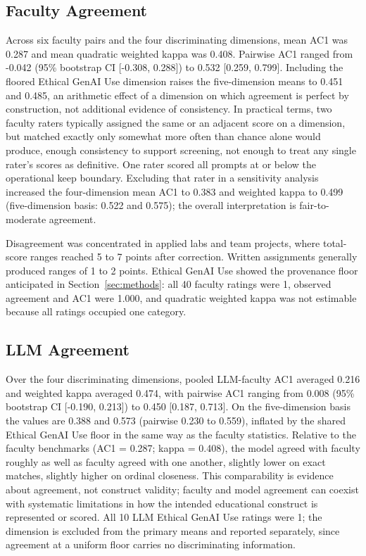 \documentclass[sigconf]{acmart}
\begin{document}
\subsection{Faculty Agreement}
Across six faculty pairs and the four discriminating dimensions, mean AC1 was 0.287 and mean quadratic weighted kappa was 0.408. Pairwise AC1 ranged from -0.042 (95\% bootstrap CI [-0.308, 0.288]) to 0.532 [0.259, 0.799]. Including the floored Ethical GenAI Use dimension raises the five-dimension means to 0.451 and 0.485, an arithmetic effect of a dimension on which agreement is perfect by construction, not additional evidence of consistency. In practical terms, two faculty raters typically assigned the same or an adjacent score on a dimension, but matched exactly only somewhat more often than chance alone would produce, enough consistency to support screening, not enough to treat any single rater's scores as definitive. One rater scored all prompts at or below the operational keep boundary. Excluding that rater in a sensitivity analysis increased the four-dimension mean AC1 to 0.383 and weighted kappa to 0.499 (five-dimension basis: 0.522 and 0.575); the overall interpretation is fair-to-moderate agreement.

Disagreement was concentrated in applied labs and team projects, where total-score ranges reached 5 to 7 points after correction. Written assignments generally produced ranges of 1 to 2 points. Ethical GenAI Use showed the provenance floor anticipated in Section~\ref{sec:methods}: all 40 faculty ratings were 1, observed agreement and AC1 were 1.000, and quadratic weighted kappa was not estimable because all ratings occupied one category.

\subsection{LLM Agreement}
Over the four discriminating dimensions, pooled LLM-faculty AC1 averaged 0.216 and weighted kappa averaged 0.474, with pairwise AC1 ranging from 0.008 (95\% bootstrap CI [-0.190, 0.213]) to 0.450 [0.187, 0.713]. On the five-dimension basis the values are 0.388 and 0.573 (pairwise 0.230 to 0.559), inflated by the shared Ethical GenAI Use floor in the same way as the faculty statistics. Relative to the faculty benchmarks (AC1 = 0.287; kappa = 0.408), the model agreed with faculty roughly as well as faculty agreed with one another, slightly lower on exact matches, slightly higher on ordinal closeness. This comparability is evidence about agreement, not construct validity; faculty and model agreement can coexist with systematic limitations in how the intended educational construct is represented or scored. All 10 LLM Ethical GenAI Use ratings were 1; the dimension is excluded from the primary means and reported separately, since agreement at a uniform floor carries no discriminating information.
\end{document}
